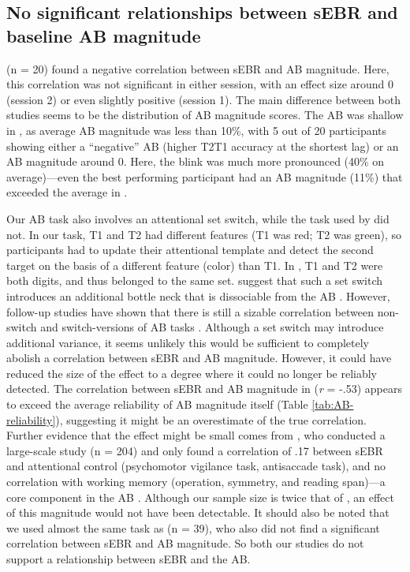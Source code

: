 \documentclass[11pt,]{memoir}
\begin{document}
\hypertarget{no-significant-relationships-between-sebr-and-baseline-ab-magnitude}{%
\subsection{No significant relationships between sEBR and baseline AB magnitude}\label{no-significant-relationships-between-sebr-and-baseline-ab-magnitude}}

\textcite{Colzato2008} (n = 20) found a negative correlation between sEBR and AB magnitude. Here, this correlation was not significant in either session, with an effect size around 0 (session 2) or even slightly positive (session 1). The main difference between both studies seems to be the distribution of AB magnitude scores. The AB was shallow in \textcite{Colzato2008}, as average AB magnitude was less than 10\%, with 5 out of 20 participants showing either a ``negative'' AB (higher T2\textbar{}T1 accuracy at the shortest lag) or an AB magnitude around 0. Here, the blink was much more pronounced (40\% on average)---even the best performing participant had an AB magnitude (11\%) that exceeded the average in \textcite{Colzato2008}.

Our AB task also involves an attentional set switch, while the task used by \textcite{Colzato2008} did not. In our task, T1 and T2 had different features (T1 was red; T2 was green), so participants had to update their attentional template and detect the second target on the basis of a different feature (color) than T1. In \textcite{Colzato2008}, T1 and T2 were both digits, and thus belonged to the same set. \textcite{Kelly2011} suggest that such a set switch introduces an additional bottle neck that is dissociable from the AB \autocite{Potter1998}. However, follow-up studies have shown that there is still a sizable correlation between non-switch and switch-versions of AB tasks \autocites{Dale2013}{Dale2013a}. Although a set switch may introduce additional variance, it seems unlikely this would be sufficient to completely abolish a correlation between sEBR and AB magnitude. However, it could have reduced the size of the effect to a degree where it could no longer be reliably detected. The correlation between sEBR and AB magnitude in \textcite{Colzato2008} (\emph{r} = -.53) appears to exceed the average reliability of AB magnitude itself (Table \ref{tab:AB-reliability}), suggesting it might be an overestimate of the true correlation. Further evidence that the effect might be small comes from \textcite{Unsworth2019}, who conducted a large-scale study (n = 204) and only found a correlation of .17 between sEBR and attentional control (psychomotor vigilance task, antisaccade task), and no correlation with working memory (operation, symmetry, and reading span)---a core component in the AB \autocites{Dux2009}{Martens2010}. Although our sample size is twice that of \textcite{Colzato2008}, an effect of this magnitude would not have been detectable. It should also be noted that we used almost the same task as \textcite{Slagter2013} (n = 39), who also did not find a significant correlation between sEBR and AB magnitude. So both our studies do not support a relationship between sEBR and the AB.
\end{document}
